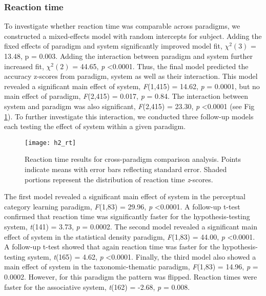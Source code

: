 \documentclass[../dissertation.tex]{subfiles}
\begin{document}
\subsubsection{Reaction time}
To investigate whether reaction time was comparable across paradigms, we constructed a mixed-effects model with random intercepts for subject. Adding the fixed effects of paradigm and system significantly improved model fit,  $\chi^{2}(3)$ = 13.48, p = 0.003. Adding the interaction between paradigm and system further increased fit,  $\chi^{2}(2)$  = 44.65, \textit{p} \textless 0.0001. Thus, the final model predicted the accuracy z-scores from paradigm, system as well as their interaction. This model revealed a significant main effect of system, \textit{F}(1,415) = 14.62, \textit{p} = 0.0001, but no main effect of paradigm, \textit{F}(2,415) = 0.017, \textit{p} = 0.84. The interaction between system and paradigm was also significant, \textit{F}(2,415) = 23.30, \textit{p} \textless 0.0001 (see Fig \ref{h2_rt}). To further investigate this interaction, we conducted three follow-up models each testing the effect of system within a given paradigm. \par

\begin{figure}[h]
\begin{center}
\texttt{[image: h2\_rt]}
\caption[Reaction time results for cross-paradigm comparison]{Reaction time results for cross-paradigm comparison analysis. Points indicate means with error bars reflecting standard error. Shaded portions represent the distribution of reaction time \textit{z}-scores.}
\vspace{-20pt}
\label{h2_rt}
\end{center}
\end{figure}	

	The first model revealed a significant main effect of system in the perceptual category learning paradigm, \textit{F}(1,83) = 29.96, \textit{p} \textless 0.0001. A follow-up t-test confirmed that reaction time was significantly faster for the hypothesis-testing system, \textit{t}(141) = 3.73, \textit{p} = 0.0002. The second model revealed a significant main effect of system in the statistical density paradigm, \textit{F}(1,83) = 44.00, \textit{p} \textless 0.0001. A follow-up t-test showed that again reaction time was faster for the hypothesis-testing system, \textit{t}(165) = 4.62, \textit{p} \textless 0.0001.  Finally, the third model also showed a main effect of system in the taxonomic-thematic paradigm, \textit{F}(1,83) = 14.96, \textit{p} = 0.0002. However, for this paradigm the pattern was flipped. Reaction times were faster for the associative system, \textit{t}(162) = -2.68, \textit{p} = 0.008.
	
\end{document}

